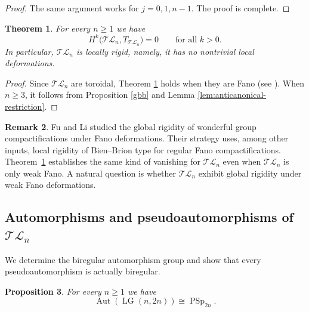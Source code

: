 \documentclass[10pt]{amsart}
\newtheorem{theorem}{Theorem}[section]
\newtheorem{proposition}[theorem]{Proposition}
\theoremstyle{definition}
\newtheorem{remark}[theorem]{Remark}
\newcommand{\Aut}{\operatorname{Aut}}
\newcommand{\LG}{\operatorname{LG}}
\DeclareMathOperator{\PSp}{PSp}
\newcommand{\TL}{\mathcal{TL}}
\theoremstyle{plain} %
\begin{document}
\begin{proof}
The same argument works for $j=0,1,n-1$. The proof is complete. 
\end{proof}


\begin{theorem}\label{thm:rigidity-absolute}
For every $n\ge 1$ we have
\[
H^k\bigl(\TL_n,T_{\TL_n}\bigr)=0\qquad\text{for all }k>0.
\]
In particular, $\TL_n$ is locally rigid, namely, it has no nontrivial local deformations.
\end{theorem}
\begin{proof}
Since $\mathcal {TL}_{n}$ are toroidal, Theorem \ref{thm:rigidity-absolute} holds when they are Fano (see \cite[Corollary 3.3.11]{Pe14}).  When $n\geq 3$, it follows from Proposition \ref{gbb} and Lemma \ref{lem:anticanonical-restriction}.
\end{proof}


\begin{remark}\label{rem:FuLi}
Fu and Li \cite{Fu24} studied the global rigidity of wonderful group compactifications under
Fano deformations. Their strategy uses, among other inputs,
local rigidity of Bien--Brion type for regular Fano compactifications. Theorem~\ref{thm:rigidity-absolute}
establishes the same kind of vanishing for $\TL_n$ even when $\TL_n$ is only weak Fano. %
A natural question is whether $\TL_n$ exhibit global rigidity under weak Fano deformations.
\end{remark}

\subsection*{Automorphisms and pseudoautomorphisms of \texorpdfstring{$\TL_n$}{TLn}}

We determine the biregular automorphism group and show that every pseudoautomorphism is actually biregular.


\begin{proposition}\label{prop:Aut-LG}
For every $n\ge 1$ we have
\[
\Aut(\LG(n,2n)) \cong \PSp_{2n}.
\]
\end{proposition}
\end{document}
